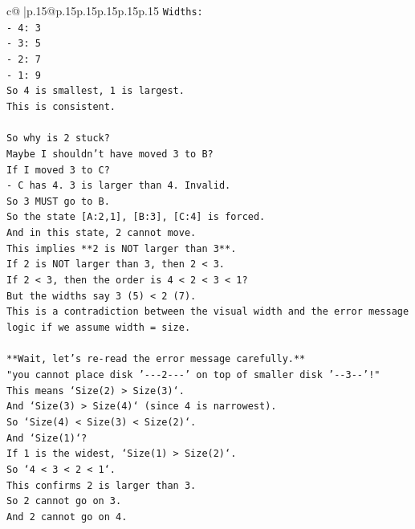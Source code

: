 \documentclass{article}
\begin{document}
{\begin{supertabular}{c@{$\;$}|p{.15\linewidth}@{}p{.15\linewidth}p{.15\linewidth}p{.15\linewidth}p{.15\linewidth}p{.15\linewidth}}
{{{\texttt{Widths:} \\
\texttt{{-} 4: 3} \\
\texttt{{-} 3: 5} \\
\texttt{{-} 2: 7} \\
\texttt{{-} 1: 9} \\
\texttt{So 4 is smallest, 1 is largest.} \\
\texttt{This is consistent.} \\
\\ 
\texttt{So why is 2 stuck?} \\
\texttt{Maybe I shouldn't have moved 3 to B?} \\
\texttt{If I moved 3 to C?} \\
\texttt{{-} C has 4. 3 is larger than 4. Invalid.} \\
\texttt{So 3 MUST go to B.} \\
\texttt{So the state {[}A:2,1{]}, {[}B:3{]}, {[}C:4{]} is forced.} \\
\texttt{And in this state, 2 cannot move.} \\
\texttt{This implies **2 is NOT larger than 3**.} \\
\texttt{If 2 is NOT larger than 3, then 2 < 3.} \\
\texttt{If 2 < 3, then the order is 4 < 2 < 3 < 1?} \\
\texttt{But the widths say 3 (5) < 2 (7).} \\
\texttt{This is a contradiction between the visual width and the error message logic if we assume width = size.} \\
\\ 
\texttt{**Wait, let's re{-}read the error message carefully.**} \\
\texttt{"you cannot place disk '{-}{-}{-}2{-}{-}{-}' on top of smaller disk '{-}{-}3{-}{-}'!"} \\
\texttt{This means `Size(2) > Size(3)`.} \\
\texttt{And `Size(3) > Size(4)` (since 4 is narrowest).} \\
\texttt{So `Size(4) < Size(3) < Size(2)`.} \\
\texttt{And `Size(1)`?} \\
\texttt{If 1 is the widest, `Size(1) > Size(2)`.} \\
\texttt{So `4 < 3 < 2 < 1`.} \\
\texttt{This confirms 2 is larger than 3.} \\
\texttt{So 2 cannot go on 3.} \\
\texttt{And 2 cannot go on 4.} \\
}}}
\end{supertabular}}
\end{document}
